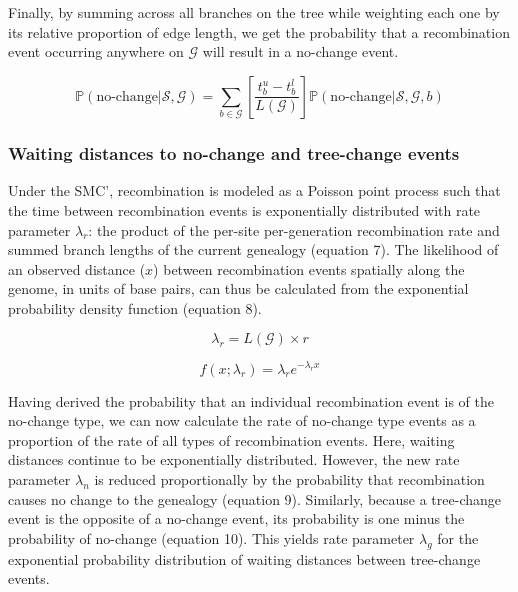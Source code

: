 \documentclass[11pt]{article}
\begin{document}
\noindent Finally, by summing across all branches on the tree 
while weighting each one by its relative proportion of edge length,
we get the probability that a recombination event occurring anywhere on 
$\mathcal{G}$ will result in a no-change event.

\begin{equation}
	\mathbb{P}(\text{no-change} | \mathcal{S},\mathcal{G}) = 
	\sum_{b \in \mathcal{G}}
	\left[\frac{t^u_b - t^l_b}{L(\mathcal{G})}\right]
	\mathbb{P}(\text{no-change} | \mathcal{S},\mathcal{G},b)
\end{equation}


\subsubsection{Waiting distances to no-change and tree-change events}
Under the SMC', recombination is modeled as a Poisson point process 
such that the time between recombination events is exponentially distributed 
with rate parameter $\lambda_r$: the product of the per-site
per-generation recombination rate and summed branch lengths of
the current genealogy \citep{wiuf_ancestry_1999} (equation 7).
The likelihood of an observed distance ($x$) between recombination
events spatially along the genome, in units of base pairs, can thus 
be calculated from the exponential probability density function 
(equation 8).

\begin{equation}
	\lambda_{r} = L(\mathcal{G}) \times r
\end{equation}

\begin{equation}
	f(x; \lambda_r) = \lambda_r e^{-\lambda_r x}
\end{equation}

\noindent Having derived the probability that an individual recombination event 
is of the no-change type, we can now calculate 
the rate of no-change type events as a proportion of the rate of all types of 
recombination events. 
Here, waiting distances continue to be exponentially distributed. 
However, the new rate parameter $\lambda_n$ is reduced proportionally by 
the probability that recombination causes no change to the genealogy
(equation 9). Similarly, because a tree-change event is the opposite 
of a no-change event, its probability is one minus the probability
of no-change (equation 10). This yields rate parameter $\lambda_g$ for 
the exponential probability distribution of waiting distances between 
tree-change events.
\end{document}
